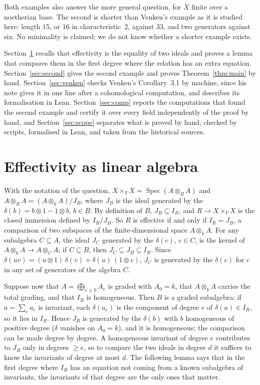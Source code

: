\documentclass[11pt,a4paper]{amsart}
\theoremstyle{remark}
\begin{document}
Both examples also answer the more general question, for $X$ finite over a noetherian base. The second is shorter than Venken's example as it is studied here: length $15$, or $16$ in characteristic~$2$, against $33$, and two generators against six. No minimality is claimed; we do not know whether a shorter example exists.

Section~\ref{sec:lin} recalls that effectivity is the equality of two ideals and proves a lemma that compares them in the first degree where the relation has an extra equation. Section~\ref{sec:second} gives the second example and proves Theorem~\ref{thm:main} by hand. Section~\ref{sec:venken} checks Venken's Corollary~3.1 by machine, since his note gives it in one line after a cohomological computation, and describes its formalisation in Lean. Section~\ref{sec:comp} reports the computations that found the second example and certify it over every field independently of the proof by hand, and Section~\ref{sec:scope} separates what is proved by hand, checked by scripts, formalised in Lean, and taken from the historical sources.

\section{Effectivity as linear algebra}\label{sec:lin}

With the notation of the question, $X \times_Y X = \operatorname{Spec}(A \otimes_B A)$ and $A \otimes_B A = (A \otimes_k A)/J_B$, where $J_B$ is the ideal generated by the $\delta(b) = b \otimes 1 - 1 \otimes b$, $b \in B$. By definition of $B$, $J_B \subseteq I_R$, and $R \to X \times_Y X$ is the closed immersion defined by $I_R / J_B$. So $R$ is effective if and only if $I_R = J_B$, a comparison of two subspaces of the finite-dimensional space $A \otimes_k A$. For any subalgebra $C \subseteq A$, the ideal $J_C$ generated by the $\delta(c)$, $c \in C$, is the kernel of $A \otimes_k A \to A \otimes_C A$; if $C \subseteq B$, then $J_C \subseteq J_B \subseteq I_R$. Since $\delta(uv) = (u \otimes 1)\,\delta(v) + \delta(u)\,(1 \otimes v)$, $J_C$ is generated by the $\delta(c)$ for $c$ in any set of generators of the algebra $C$.

Suppose now that $A = \bigoplus_{e \ge 0} A_e$ is graded with $A_0 = k$, that $A \otimes_k A$ carries the total grading, and that $I_R$ is homogeneous. Then $B$ is a graded subalgebra: if $a = \sum_e a_e$ is invariant, each $\delta(a_e)$ is the component of degree $e$ of $\delta(a) \in I_R$, so it lies in $I_R$. Hence $J_B$ is generated by the $\delta(b)$ with $b$ homogeneous of positive degree ($\delta$ vanishes on $A_0 = k$), and it is homogeneous; the comparison can be made degree by degree. A homogeneous invariant of degree $e$ contributes to $J_B$ only in degrees $\ge e$, so to compare the two ideals in degree $d$ it suffices to know the invariants of degree at most $d$. The following lemma says that in the first degree where $I_R$ has an equation not coming from a known subalgebra of invariants, the invariants of that degree are the only ones that matter.
\end{document}
